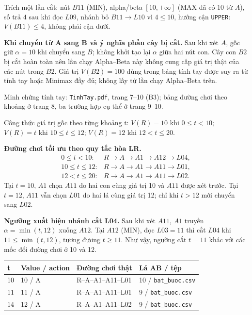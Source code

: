 \documentclass[11pt,a4paper]{article}
\newcommand{\head}[1]{\par\Needspace{3\baselineskip}\medskip{\large\sffamily\bfseries\color{Ink}#1}\par}
\begin{document}
Trích một lần cắt: nút $B11$ (MIN), alpha/beta $[10,+\infty]$ (MAX đã có 10 từ $A$), số trả $4$ sau khi đọc $L09$, nhánh bỏ $B11\to L10$ vì $4\le10$, hướng cận \texttt{UPPER}: $V(B11)\le4$, không phải cận dưới.\par\medskip
\textbf{Khi chuyển từ A sang B và ý nghĩa phần cây bị cắt.}
Sau khi xét $A$, gốc giữ $\alpha=10$ khi chuyển sang $B$; không khởi tạo lại $\alpha$ giữa hai nút con. Cây con $B2$ bị cắt hoàn toàn nên lần chạy Alpha--Beta này không cung cấp giá trị thật của các nút trong $B2$. Giá trị $V(B2)=100$ dùng trong bảng tính tay được suy ra từ tính tay hoặc Minimax đầy đủ; không lấy từ lần chạy Alpha--Beta trên.\par\medskip
\head{5. T(t): thay riêng L01}
Minh chứng tính tay: \texttt{TinhTay.pdf}, trang 7--10 (B3); bảng đường chơi theo khoảng ở trang 8, ba trường hợp cụ thể ở trang 9--10.\par
Công thức giá trị gốc theo từng khoảng t: $V(R)=10$ khi $0\le t<10$; $V(R)=t$ khi $10\le t \le12$; $V(R)=12$ khi $12< t\le20$.\par
\textbf{Đường chơi tối ưu theo quy tắc hòa LR.}
\[
\begin{array}{ll}
0\le t<10: & R\to A\to A1\to A12\to L04,\\
10\le t\le12: & R\to A\to A1\to A11\to L01,\\
12<t\le20: & R\to A\to A1\to A11\to L02.
\end{array}
\]
Tại $t=10$, $A1$ chọn $A11$ do hai con cùng giá trị 10 và $A11$ được xét trước. Tại $t=12$, $A11$ vẫn chọn $L01$ do hai lá cùng giá trị 12; chỉ khi $t>12$ mới chuyển sang $L02$.\par
\textbf{Ngưỡng xuất hiện nhánh cắt L04.}
Sau khi xét $A11$, $A1$ truyền $\alpha=\min(t,12)$ xuống $A12$. Tại $A12$ (MIN), đọc $L03=11$ thì cắt $L04$ khi $11\le\min(t,12)$, tương đương $t\ge11$. Như vậy, ngưỡng cắt $t=11$ khác với các mốc đổi đường chơi ở 10 và 12.\par\medskip
\begingroup\footnotesize\renewcommand{\arraystretch}{1.45}\begin{tabularx}{\linewidth}{XXXX}\toprule
\textbf{t} & \textbf{Value / action} & \textbf{Đường chơi thật} & \textbf{Lá AB / tệp}\\\midrule
10 & 10 / A & R--A--A1--A11--L01 & 10 / \texttt{bat\_buoc.csv}\\
11 & 11 / A & R--A--A1--A11--L01 & 9 / \texttt{bat\_buoc.csv}\\
14 & 12 / A & R--A--A1--A11--L02 & 9 / \texttt{bat\_buoc.csv}\\
\bottomrule\end{tabularx}\endgroup\par\medskip
\end{document}
